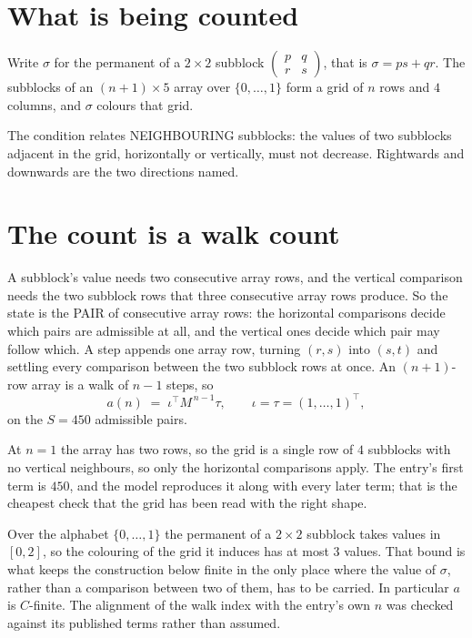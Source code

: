 \documentclass[11pt,a4paper]{article}
\theoremstyle{plain}
\theoremstyle{definition}
\begin{document}
\section{What is being counted}

Write $\sigma$ for the permanent of a $2\times2$ subblock
$\begin{pmatrix}p&q\\r&s\end{pmatrix}$, that is $\sigma=ps+qr$. The subblocks of an
$(n+1)\times5$ array over $\{0,\dots,1\}$ form a grid of $n$ rows and $4$
columns, and $\sigma$ colours that grid.

The condition relates NEIGHBOURING subblocks: the values of two subblocks adjacent in the grid,
horizontally or vertically, must not decrease. Rightwards and downwards are the two directions named.

\section{The count is a walk count}

A subblock's value needs two consecutive array rows, and the vertical
comparison needs the two subblock rows that three consecutive array rows produce. So the state
is the PAIR of consecutive array rows: the horizontal comparisons decide which pairs are
admissible at all, and the vertical ones decide which pair may follow which. A step appends one
array row, turning $(r,s)$ into $(s,t)$ and settling every comparison between the two subblock
rows at once. An $(n+1)$-row array is a walk of $n-1$ steps, so
\[
a(n)\;=\;\iota^{\!\top}M^{\,n-1}\tau,\qquad\iota=\tau=(1,\dots,1)^{\!\top},
\]
on the $S=450$ admissible pairs.

At $n=1$ the array has two rows, so the grid is a single row of $4$
subblocks with no vertical neighbours, so only the horizontal comparisons apply. The
entry's first term is $450$, and the model reproduces it along with every later term; that
is the cheapest check that the grid has been read with the right shape.

Over the alphabet $\{0,\dots,1\}$ the permanent of a $2\times2$ subblock takes values in
$[0,2]$, so the colouring of the grid it induces has at most $3$ values.
That bound is what keeps the construction below finite in the only place where the value of
$\sigma$, rather than a comparison between two of them, has to be carried.
In particular $a$ is $C$-finite. The alignment of the walk index with the entry's own $n$ was
checked against its published terms rather than assumed.
\end{document}
